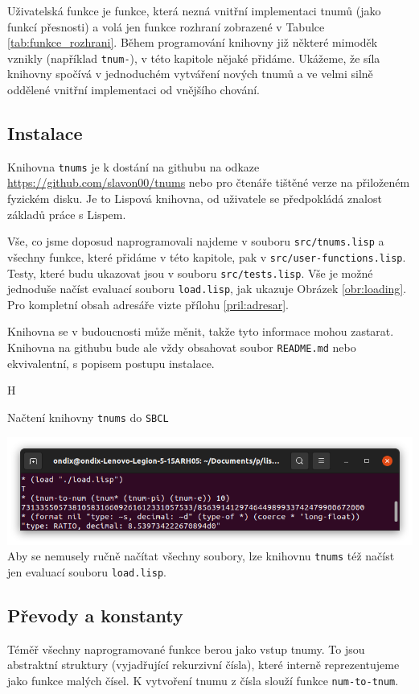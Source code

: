 Uživatelská funkce je funkce, která nezná vnitřní implementaci tnumů (jako funkcí přesnosti) a volá jen funkce rozhraní zobrazené v Tabulce \ref{tab:funkce_rozhrani}. Během programování knihovny již některé mimoděk vznikly (například \texttt{tnum-}), v této kapitole nějaké přidáme. Ukážeme, že síla knihovny spočívá v jednoduchém vytváření nových tnumů a ve velmi silně oddělené vnitřní implementaci od vnějšího chování.

\subsection{Instalace}\label{ssec:inst}
Knihovna \texttt{tnums} je k dostání na githubu na odkaze \url{https://github.com/slavon00/tnums} nebo pro čtenáře tištěné verze na přiloženém fyzickém disku. Je to Lispová knihovna, od uživatele se předpokládá znalost základů práce s Lispem.

Vše, co jsme doposud naprogramovali najdeme v souboru \texttt{src/tnums.lisp} a všechny funkce, které přidáme v této kapitole, pak v \texttt{src/user-functions.lisp}. Testy, které budu ukazovat jsou v souboru \texttt{src/tests.lisp}. Vše je možné jednoduše načíst evaluací souboru \texttt{load.lisp}, jak ukazuje Obrázek \ref{obr:loading}. Pro kompletní obsah adresáře vizte přílohu \ref{pril:adresar}.

Knihovna se v budoucnosti může měnit, takže tyto informace mohou zastarat. Knihovna na githubu bude ale vždy obsahovat soubor \texttt{README.md} nebo ekvivalentní, s popisem postupu instalace.

\begin{myfigure}{H}
\caption{Načtení knihovny \texttt{tnums} do \texttt{SBCL}}
\includegraphics[width=\linewidth]{./graphics/loading2.png}\label{obr:loading}
Aby se nemusely ručně načítat všechny soubory, lze knihovnu \texttt{tnums} též načíst jen evaluací souboru \texttt{load.lisp}. 
\end{myfigure}

\subsection{Převody a konstanty}
Téměř všechny naprogramované funkce berou jako vstup tnumy. To jsou abstraktní struktury (vyjadřující rekurzivní čísla), které interně reprezentujeme jako funkce malých čísel. K vytvoření tnumu z čísla slouží funkce \texttt{num-to-tnum}.

